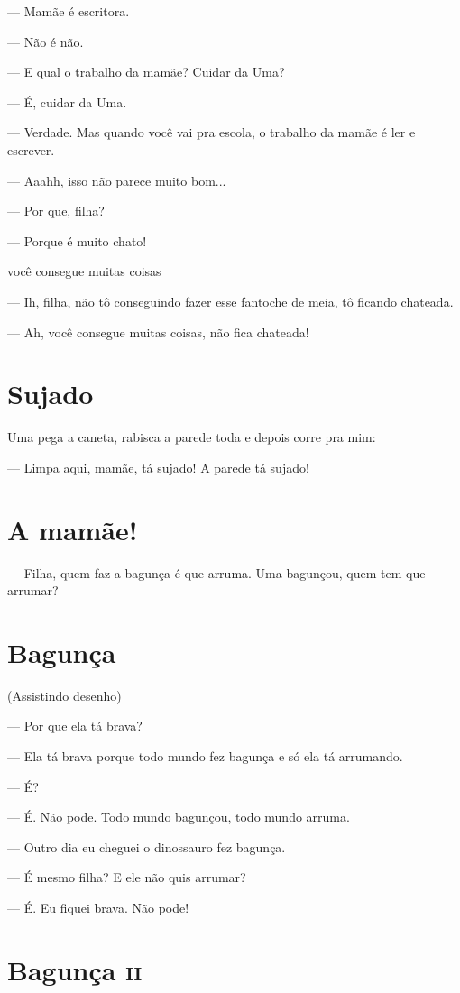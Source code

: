 — Mamãe é escritora.

— Não é não.

— E qual o trabalho da mamãe? Cuidar da Uma?

— É, cuidar da Uma.

— Verdade. Mas quando você vai pra escola, o trabalho da mamãe é ler e
escrever.

— Aaahh, isso não parece muito bom...

— Por que, filha?

— Porque é muito chato!

você consegue muitas coisas

— Ih, filha, não tô conseguindo fazer esse fantoche de meia, tô ficando
chateada.

— Ah, você consegue muitas coisas, não fica chateada!

\chapter{Sujado}

Uma pega a caneta, rabisca a parede toda e depois corre pra mim:

— Limpa aqui, mamãe, tá sujado! A parede tá sujado!

\chapter{A mamãe!}

— Filha, quem faz a bagunça é que arruma. Uma bagunçou, quem tem que
arrumar?

\chapter{Bagunça}

(Assistindo desenho)

— Por que ela tá brava?

— Ela tá brava porque todo mundo fez bagunça e só ela tá arrumando.

— É?

— É. Não pode. Todo mundo bagunçou, todo mundo arruma.

— Outro dia eu cheguei o dinossauro fez bagunça.

— É mesmo filha? E ele não quis arrumar?

— É. Eu fiquei brava. Não pode!

\chapter{Bagunça \textsc{ii}}

